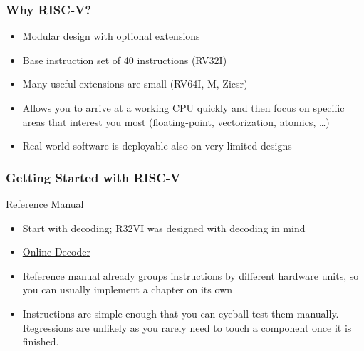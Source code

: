 \documentclass[aspectratio=169]{beamer}
\newif\iftransitions
\newcommand{\cpause}{\iftransitions \pause \fi}
\begin{document}
\begin{frame}
  \frametitle{Why RISC-V?}

  \begin{itemize}
    \item Modular design with optional extensions \cpause
    \item Base instruction set of 40 instructions (RV32I) \cpause
    \item Many useful extensions are small (RV64I, M, Zicsr) \cpause
    \item Allows you to arrive at a working CPU quickly and then focus on specific areas that interest you most (floating-point, vectorization, atomics, \dots) \cpause
    \item Real-world software is deployable also on very limited designs
  \end{itemize}
\end{frame}

\begin{frame}
  \frametitle{Getting Started with RISC-V}

  \href{https://docs.riscv.org/reference/isa/_attachments/riscv-unprivileged.pdf}{Reference Manual}

  \vspace{2em}
  \cpause

  \begin{itemize}
    \item Start with decoding; R32VI was designed with decoding in mind
    \item \href{https://luplab.gitlab.io/rvcodecjs/}{Online Decoder} \cpause
    \item Reference manual already groups instructions by different hardware units, so you can usually implement a chapter on its own \cpause
    \item Instructions are simple enough that you can eyeball test them manually. Regressions are unlikely as you rarely need to touch a component once it is finished.

  \end{itemize}
\end{frame}
\end{document}
